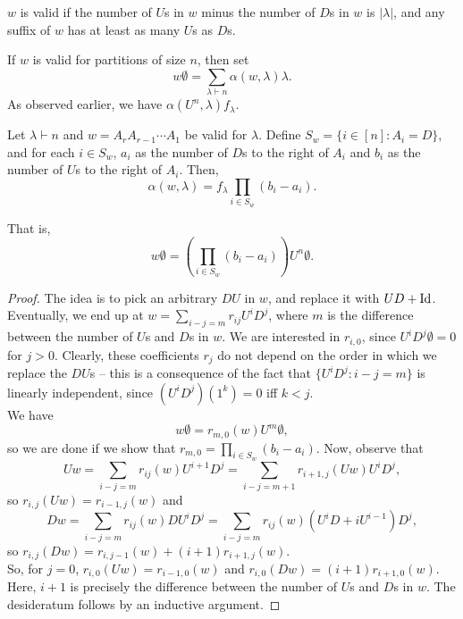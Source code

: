 \begin{fprop}
	$w$ is valid if the number of $U$s in $w$ minus the number of $D$s in $w$ is $|\lambda|$, and any suffix of $w$ has at least as many $U$s as $D$s.
\end{fprop}

If $w$ is valid for partitions of size $n$, then set
\[ w\emptyset = \sum_{\lambda \vdash n} \alpha(w,\lambda) \lambda. \]
As observed earlier, we have $\alpha(U^n,\lambda) f_\lambda$.

\begin{ftheo}
	Let $\lambda \vdash n$ and $w = A_r A_{r-1} \cdots A_1$ be valid for $\lambda$. Define $S_w = \{i \in [n] : A_i = D\}$, and for each $i \in S_w$, $a_i$ as the number of $D$s to the right of $A_i$ and $b_i$ as the number of $U$s to the right of $A_i$. Then,
	\[ \alpha(w,\lambda) = f_\lambda \prod_{i \in S_w} (b_i - a_i).  \]
\end{ftheo}
That is,
\[ w\emptyset = \left(\prod_{i \in S_w} (b_i - a_i)\right) U^n\emptyset. \]
\begin{proof}
	The idea is to pick an arbitrary $DU$ in $w$, and replace it with $UD + \operatorname{Id}$. Eventually, we end up at $w = \sum_{i-j=m} r_{ij} U^i D^j$, where $m$ is the difference between the number of $U$s and $D$s in $w$. We are interested in $r_{i,0}$, since $U^iD^j \emptyset = 0$ for $j > 0$. Clearly, these coefficients $r_j$ do not depend on the order in which we replace the $DU$s -- this is a consequence of the fact that $\{U^iD^j : i-j = m\}$ is linearly independent, since $(U^iD^j)(1^k) = 0$ iff $k < j$.\\
	We have
	\[ w\emptyset = r_{m,0} (w) U^m \emptyset, \]
	so we are done if we show that $r_{m,0} = \prod_{i \in S_w} (b_i - a_i)$.
	Now, observe that
	\[ Uw = \sum_{i-j = m} r_{ij}(w)U^{i+1}D^j = \sum_{i-j=m+1} r_{i+1,j}(Uw) U^{i} D^j, \]
	so $r_{i,j}(Uw) = r_{i-1,j}(w)$ and
	\[ Dw = \sum_{i-j = m} r_{ij}(w) DU^{i}D^j = \sum_{i-j = m} r_{ij}(w) (U^iD + iU^{i-1}) D^j, \]
	so $r_{i,j}(Dw) = r_{i,j-1}(w) + (i+1) r_{i+1,j}(w)$.\\
	So, for $j = 0$, $r_{i,0}(Uw) = r_{i-1,0}(w)$ and $r_{i,0}(Dw) = (i+1) r_{i+1,0}(w)$. Here, $i+1$ is precisely the difference between the number of $U$s and $D$s in $w$. The desideratum follows by an inductive argument.
\end{proof}

